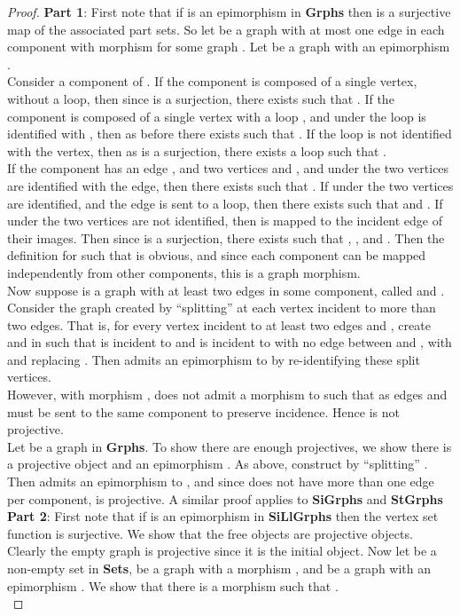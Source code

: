 \documentclass[11pt]{article}
\begin{document}
\begin{proof}
\textbf{Part 1}: First note that if  is an epimorphism in \textbf{Grphs} then  is a surjective map of the associated part sets. So let  be a graph with at most one edge in each component with morphism  for some graph . Let  be a graph with an epimorphism .\\
\indent Consider a component of . If the component is composed of a single vertex,  without a loop, then since  is a surjection, there exists  such that . If the component is composed of a single vertex  with a loop , and under  the loop is identified with , then as before there exists  such that . If the loop is not identified with the vertex, then as  is a surjection, there exists a loop  such that .\\
\indent If the component has an edge , and two vertices  and , and under  the two vertices are identified with the edge, then there exists  such that . If under  the two vertices are identified, and the edge is sent to a loop, then there exists  such that  and . If under  the two vertices are not identified, then  is mapped to the incident edge of their images. Then since  is a surjection, there exists  such that , , and . Then the definition for  such that  is obvious, and since each component can be mapped independently from other components, this is a graph morphism.\\
\indent Now suppose  is a graph with at least two edges in some component, called  and . Consider the graph  created by ``splitting''  at each vertex incident to more than two edges. That is, for every vertex  incident to at least two edges  and , create  and  in  such that  is incident to  and  is incident to  with no edge between  and , with  and  replacing . Then  admits an epimorphism  to  by re-identifying these split vertices.\\
\indent However, with morphism ,  does not admit a morphism  to  such that  as edges  and  must be sent to the same component to preserve incidence. Hence  is not projective.\\
\indent Let  be a graph in \textbf{Grphs}. To show there are enough projectives, we show there is a projective object  and an epimorphism . As above, construct  by ``splitting'' . Then  admits an epimorphism to , and since  does not have more than one edge per component,  is projective. A similar proof applies to \textbf{SiGrphs} and \textbf{StGrphs}\\
\indent \textbf{Part 2}: First note that if  is an epimorphism in \textbf{SiLlGrphs} then the vertex set function  is surjective. We show that the free objects are projective objects. Clearly the empty graph  is projective since it is the initial object. Now let  be a non-empty set in \textbf{Sets},  be a graph with a morphism , and  be a graph with an epimorphism . We show that there is a morphism  such that .\\

\end{proof}
\end{document}
